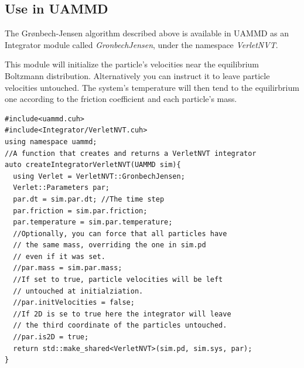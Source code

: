 \documentclass[ twoside,openright,titlepage,numbers=noenddot,%
headinclude,footinclude,cleardoublepage=empty,abstract=on,
BCOR=5mm,paper=a4,fontsize=11pt, dvipsnames
]{scrreprt}
\newcommand{\uammd}{\gls{UAMMD}\xspace}
\begin{document}
\subsection{Use in UAMMD}
The Grønbech-Jensen algorithm described above is available in \uammd as an Integrator module called \emph{GronbechJensen}, under the namespace \emph{VerletNVT}.

This module will initialize the particle's velocities near the equilibrium Boltzmann distribution.
Alternatively you can instruct it to leave particle velocities untouched. The system's temperature will then tend to the equilirbrium one according to the friction coefficient and each particle's mass.

\begin{verbatim}
#include<uammd.cuh>
#include<Integrator/VerletNVT.cuh>
using namespace uammd;
//A function that creates and returns a VerletNVT integrator
auto createIntegratorVerletNVT(UAMMD sim){
  using Verlet = VerletNVT::GronbechJensen;
  Verlet::Parameters par;
  par.dt = sim.par.dt; //The time step
  par.friction = sim.par.friction;
  par.temperature = sim.par.temperature; 
  //Optionally, you can force that all particles have
  // the same mass, overriding the one in sim.pd
  // even if it was set.
  //par.mass = sim.par.mass;
  //If set to true, particle velocities will be left
  // untouched at initialziation.
  //par.initVelocities = false;
  //If 2D is se to true here the integrator will leave
  // the third coordinate of the particles untouched.
  //par.is2D = true;
  return std::make_shared<VerletNVT>(sim.pd, sim.sys, par);
}
\end{verbatim}
\end{document}
